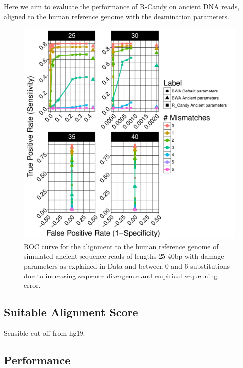 \documentclass[11pt,a4paper]{report}
\begin{document}
Here we aim to evaluate the performance of R-Candy on ancient DNA reads, 
aligned to the human reference genome with the deamination parameters.


\begin{figure}[H]
\centering
\includegraphics[width=12cm]{pictures/bROC_DS4_emp.pdf}


\caption{
ROC curve for the alignment to the human reference genome of simulated ancient 
sequence reads of lengths 25-40bp with damage parameters as explained in Data 
and between 0 and 6 substitutions due to increasing sequence divergence and
empirical sequencing error.
}

\label{DS4_emp}
\end{figure}



\subsection{Suitable Alignment Score}
Sensible cut-off from hg19.



\subsection{Performance} \label{Performance}
\end{document}
